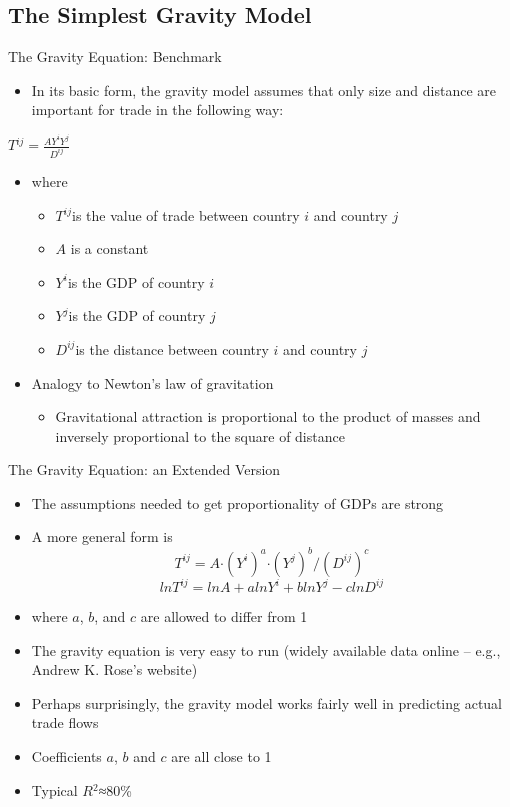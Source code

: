 \documentclass[10pt,hyperref={CJKbookmarks=true},xcolor=dvipsnames,aspectratio=169]{beamer}
\begin{document}
\subsection{The Simplest Gravity Model}
\begin{frame}{The Gravity Equation: Benchmark}

\begin{itemize}
\item In its basic form, the gravity model assumes that only size and distance
are important for trade in the following way:
\end{itemize}

\begin{center}
$T{}^{ij}=\frac{AY^{i}Y^{j}}{D^{ij}}$
\par\end{center}
\begin{itemize}
\item where

\begin{itemize}
\item $T{}^{ij}$is the value of trade between country $i$ and country
$j$
\item $A$ is a constant 
\item $Y^{i}$is the GDP of country $i$ 
\item $Y^{j}$is the GDP of country $j$ 
\item $D^{ij}$is the distance between country $i$ and country $j$ 
\end{itemize}
\item Analogy to Newton’s law of gravitation 

\begin{itemize}
\item Gravitational attraction is proportional to the product of masses
and inversely proportional to the square of distance 
\end{itemize}
\end{itemize}
\end{frame}

\begin{frame}{The Gravity Equation: an Extended Version}

\begin{itemize}
\item The assumptions needed to get proportionality of GDPs are strong 
\item A more general form is
\[
T^{ij}=A\text{·}(Y^{i})^{a}\text{·}(Y^{j})^{b}/(D^{ij})^{c}
\]
\[
lnT^{ij}=lnA+alnY^{i}+blnY^{j}-clnD^{ij}
\]

\item where $a$, $b$, and $c$ are allowed to differ from 1 
\item The gravity equation is very easy to run (widely available data online
– e.g., Andrew K. Rose’s website) 
\item Perhaps surprisingly, the gravity model works fairly well in predicting
actual trade flows 
\item Coefficients $a$, $b$ and $c$ are all close to 1 
\item Typical $R{}^{2}$≈80\%
\end{itemize}
\end{frame}
\end{document}
